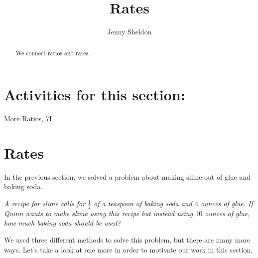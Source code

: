 \documentclass{ximera}
\title{Rates}
\author{Jenny Sheldon}
\begin{document}
\begin{abstract}
We connect ratios and rates.
\end{abstract}
\maketitle

\section{Activities for this section:} More Ratios, 7I

\section{Rates}

In the previous section, we solved a problem about making slime out of glue and baking soda.

\emph{A recipe for slime calls for $\frac{1}{2}$ of a teaspoon of baking soda and $4$ ounces of glue. If Quinn wants to make slime using this recipe but instead using $10$ ounces of glue, how much baking soda should be used?}

We used three different methods to solve this problem, but there are many more ways. Let's take a look at one more in order to motivate our work in this section.
\end{document}
